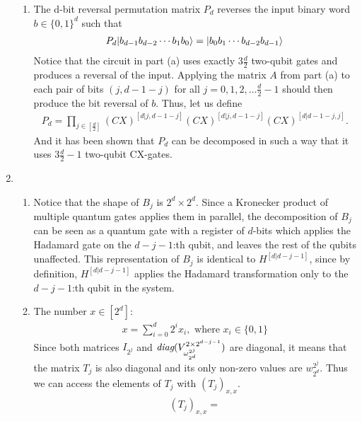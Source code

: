 \documentclass[11pt,a4paper]{article}
\begin{document}
\begin{enumerate}
\begin{enumerate}
              \item The d-bit reversal permutation matrix $P_d$ reverses the input binary word $b \in \{0, 1\}^d$ such that
                    \begin{align*}
                        P_d|b_{d - 1}b_{d-2} \cdots b_1 b_0\rangle = |b_0 b_1 \cdots b_{d - 2} b_{d - 1}\rangle
                    \end{align*}
                    Notice that the circuit in part (a) uses exactly $3 \frac{d}{2}$ two-qubit gates and produces
                    a reversal of the input. Applying the matrix $A$ from part (a) to each pair of bits $(j, d - 1 - j)$ for all
                    $j = 0, 1, 2, \dots \frac{d}{2} - 1$ should then produce the bit reversal of $b$. Thus, let us define
                    \begin{align*}
                        P_d = \prod_{j \in [\frac{d}{2}]} (CX)^{[d|j, d - 1 - j]} (CX)^{[d|j, d - 1 - j]} (CX)^{[d| d - 1 - j, j]}.
                    \end{align*}
                    And it has been shown that $P_d$ can be decomposed in such a way that it uses $3 \frac{d}{2} - 1$ two-qubit CX-gates.
          \end{enumerate}

          \newpage

    \item \begin{enumerate}

              \item Notice that the shape of $B_j$ is $2^d \times 2^d$. Since a Kronecker product of multiple quantum gates
                    applies them in parallel, the decomposition of $B_j$ can be seen as a quantum gate with a register of $d$-bits which applies the
                    Hadamard gate on the $d - j - 1$:th qubit, and leaves the rest of the qubits unaffected. This
                    representation of $B_j$ is identical to $H^{[d|d-j-1]}$, since by definition, $H^{[d|d-j-1]}$ applies the Hadamard
                    transformation only to the $d-j-1$:th qubit in the system.

              \item The number  $x \in [2^d]$:
                    \begin{align*}
                        x = \sum_{i = 0}^{d} 2^i x_{i},  \text{ where } x_i \in \{0,1\}
                    \end{align*}
                    Since both matrices $I_{2^j}$ and $\textit{diag}{(V_{\omega^{2^j}_{2^d}}^{2 \times 2^{d-j-1}})}$ are diagonal, it means that
                    the matrix $T_j$ is also diagonal and its only non-zero values are $w_{2^d}^{2^j}$.
                    Thus we can access the elements of $T_j$ with $(T_j)_{x, x}$.
                    \begin{align*}
                        (T_j)_{x, x} = 
                    \end{align*}
          \end{enumerate}


\end{enumerate}
\end{document}
